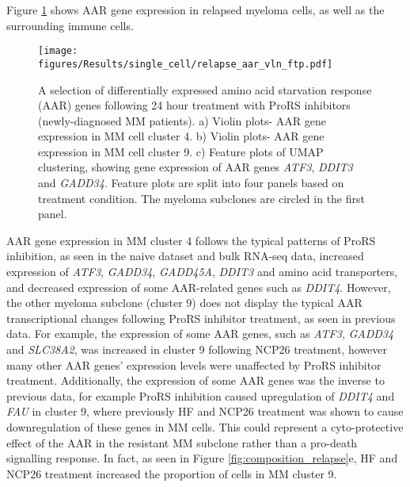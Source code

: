 Figure \ref{fig:relapse_aar_vln_ftp} shows AAR gene expression in relapsed myeloma cells, as well as the surrounding immune cells.
%
\begin{figure}[htb]
\centering
\texttt{[image: figures/Results/single\_cell/relapse\_aar\_vln\_ftp.pdf]}
\caption[scRNA-seq differentially expressed AAR genes- relapsed MM]{A selection of differentially expressed amino acid starvation response (AAR) genes following 24 hour treatment with ProRS inhibitors (newly-diagnosed MM patients).
    a) Violin plots- AAR gene expression in MM cell cluster 4.
    b) Violin plots- AAR gene expression in MM cell cluster 9.
    c) Feature plots of UMAP clustering, showing gene expression of AAR genes \textit{ATF3}, \textit{DDIT3} and \textit{GADD34}.
Feature plots are split into four panels based on treatment condition.
The myeloma subclones are circled in the first panel.
}
\label{fig:relapse_aar_vln_ftp}
\end{figure}
AAR gene expression in MM cluster 4 follows the typical patterns of ProRS inhibition, as seen in the naive dataset and bulk RNA-seq data, increased expression of \textit{ATF3}, \textit{GADD34}, \textit{GADD45A}, \textit{DDIT3} and amino acid transporters, and decreased expression of some AAR-related genes such as \textit{DDIT4}.
However, the other myeloma subclone (cluster 9) does not display the typical AAR transcriptional changes following ProRS inhibitor treatment, as seen in previous data.
For example, the expression of some AAR genes, such as \textit{ATF3}, \textit{GADD34} and \textit{SLC38A2}, was increased in cluster 9 following NCP26 treatment, however many other AAR genes' expression levels were unaffected by ProRS inhibitor treatment.
Additionally, the expression of some AAR genes was the inverse to previous data, for example ProRS inhibition caused upregulation of \textit{DDIT4} and \textit{FAU} in cluster 9, where previously HF and NCP26 treatment was shown to cause downregulation of these genes in MM cells.
This could represent a cyto-protective effect of the AAR in the resistant MM subclone rather than a pro-death signalling response.
In fact, as seen in Figure \ref{fig:composition_relapse}e, HF and NCP26 treatment increased the proportion of cells in MM cluster 9.

